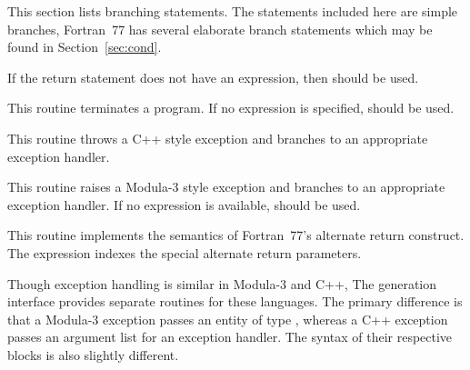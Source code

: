 This section lists branching statements.  The statements included here
are simple branches, Fortran~77 has several elaborate branch
statements which may be found in Section~\ref{sec:cond}.

\begin{functionality}
If the return statement does not have an expression, then
 should be used.
\end{functionality}
\begin{functionality}
This routine terminates a program.  If no expression is specified,
 should be used.
\end{functionality}

\begin{functionality}
This routine throws a C++ style exception and branches to an
appropriate exception handler.
\end{functionality}

\begin{functionality}
This routine raises a Modula-3 style exception and branches to an
appropriate exception handler.  If no expression is available,
 should be used.
\end{functionality}

\begin{functionality}
This routine implements the semantics of Fortran~77's alternate
return construct.  The expression indexes the special alternate return
parameters.  
\end{functionality}


Though exception handling is similar in Modula-3 and C++, The
generation interface provides separate routines for these languages.
The primary difference is that a Modula-3 exception passes an entity
of type , whereas a C++ exception passes an argument
list for an exception handler.  The syntax of their respective
 blocks is also slightly different.

